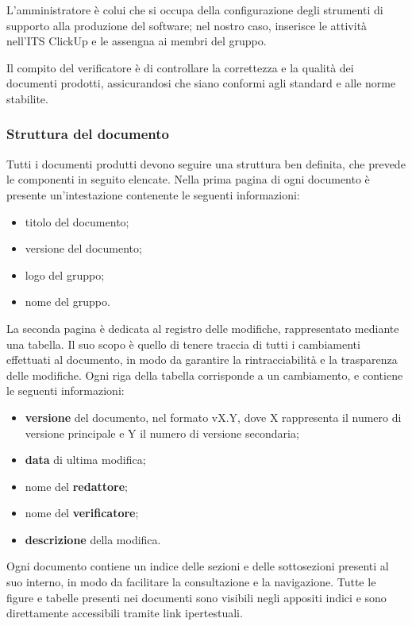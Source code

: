 L’amministratore è colui che si occupa della configurazione degli strumenti di supporto alla produzione del software; nel nostro caso,
inserisce le attività nell'ITS ClickUp e le assengna ai membri del gruppo.

Il compito del verificatore è di controllare la correttezza e la qualità dei documenti prodotti, assicurandosi che siano conformi agli standard e alle norme stabilite.

\subsubsection{Struttura del documento}
Tutti i documenti produtti devono seguire una struttura ben definita, che prevede le componenti in seguito elencate.
Nella prima pagina di ogni documento è presente un'intestazione contenente le seguenti informazioni:
\begin{itemize}
	\item titolo del documento;
	\item versione del documento;
	\item logo del gruppo;
	\item nome del gruppo.
\end{itemize}

La seconda pagina è dedicata al registro delle modifiche, rappresentato mediante una tabella. Il suo scopo è quello di tenere traccia di tutti i cambiamenti effettuati al documento,
in modo da garantire la rintracciabilità e la trasparenza delle modifiche. Ogni riga della tabella corrisponde a un cambiamento, e contiene le seguenti informazioni:
\begin{itemize}
	\item \textbf{versione} del documento, nel formato vX.Y, dove X rappresenta il numero di versione principale e Y il numero di versione secondaria;
	\item \textbf{data} di ultima modifica;
	\item nome del \textbf{redattore};
	\item nome del \textbf{verificatore};
	\item \textbf{descrizione} della modifica.
\end{itemize}

Ogni documento contiene un indice delle sezioni e delle sottosezioni presenti al suo interno, in modo da facilitare la consultazione e la navigazione.
Tutte le figure e tabelle presenti nei documenti sono visibili negli appositi indici e sono direttamente accessibili tramite link ipertestuali.

